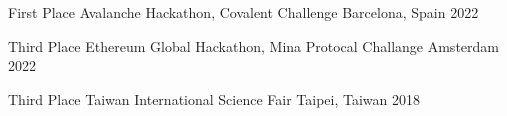 




\begin{cvhonors}

  \cvhonor
    {First Place} %
    {Avalanche Hackathon, Covalent Challenge } %
    {Barcelona, Spain} %
    {2022} %

  \cvhonor
    {Third Place} %
    {Ethereum Global Hackathon, Mina Protocal Challange } %
    {Amsterdam} %
    {2022} %

  \cvhonor
    {Third Place} %
    {Taiwan International Science Fair} %
    {Taipei, Taiwan} %
    {2018} %

\end{cvhonors}


